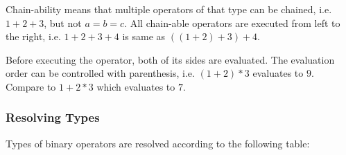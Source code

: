 Chain-ability means that multiple operators of that type can be chained, i.e.
$1 + 2 + 3$, but not $a = b = c$.
All chain-able operators are executed from left to the right, i.e.
$1+2+3+4$ is same as $((1+2)+3)+4$.

Before executing the operator, both of its sides are evaluated.
The evaluation order can be controlled with parenthesis, i.e.
$(1+2)*3$ evaluates to $9$.
Compare to $1+2*3$ which evaluates to $7$.

\subsubsection{Resolving Types}
\label{typeresolve}
\newcommand\type[1]{\hyperref[type:#1]{#1}}

Types of binary operators are resolved according to the following table:

